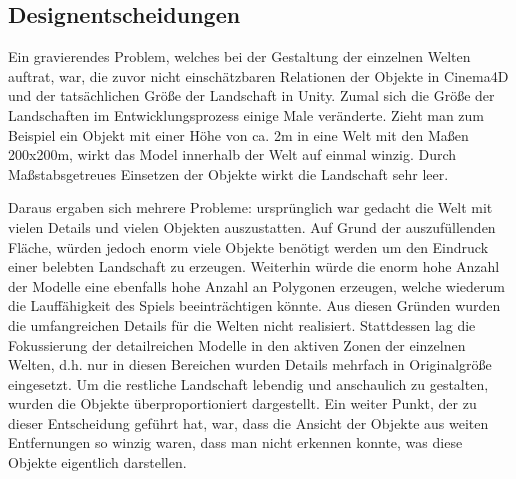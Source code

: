 \subsection{Designentscheidungen}
 
Ein gravierendes Problem, welches bei der Gestaltung der einzelnen Welten auftrat, war, die zuvor nicht einschätzbaren Relationen der Objekte in Cinema4D und der tatsächlichen Größe der Landschaft in Unity. Zumal sich die Größe der Landschaften im Entwicklungsprozess einige Male veränderte. Zieht man zum Beispiel ein Objekt mit einer Höhe von ca. 2m in eine Welt mit den Maßen 200x200m, wirkt das Model innerhalb der Welt auf einmal winzig. Durch Maßstabsgetreues Einsetzen der Objekte wirkt die Landschaft sehr leer. 

Daraus ergaben sich mehrere Probleme: ursprünglich war gedacht die Welt mit vielen Details und vielen Objekten auszustatten. Auf Grund der auszufüllenden Fläche, würden jedoch enorm viele Objekte benötigt werden um den Eindruck einer belebten Landschaft zu erzeugen. Weiterhin würde die enorm hohe Anzahl der Modelle eine ebenfalls hohe Anzahl an Polygonen erzeugen, welche wiederum die Lauffähigkeit des Spiels beeinträchtigen könnte. Aus diesen Gründen wurden die umfangreichen Details für die Welten nicht realisiert. Stattdessen lag die Fokussierung der detailreichen Modelle in den aktiven Zonen der einzelnen Welten, d.h. nur in diesen Bereichen wurden Details mehrfach in Originalgröße eingesetzt. Um die restliche Landschaft lebendig und anschaulich zu gestalten, wurden die Objekte überproportioniert dargestellt. Ein weiter Punkt, der zu dieser Entscheidung geführt hat, war, dass die Ansicht der Objekte aus weiten Entfernungen so winzig waren, dass man nicht erkennen konnte, was diese Objekte eigentlich darstellen.